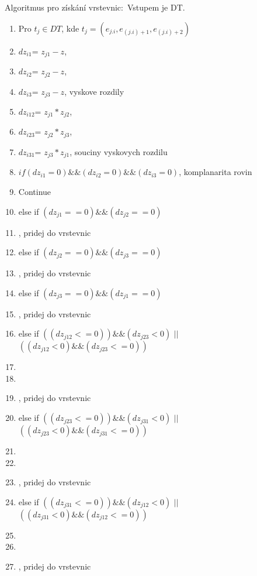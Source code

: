 \documentclass[oneside,12pt,a4paper]{book}
\begin{document}
Algoritmus pro získání vrstevnic$:$
Vstupem je DT.
\begin{enumerate}
\item Pro $t_j \in DT$, kde $t_j = (e_{j.i}, e_{(j.i)+1}, e_{(j.i)+2})$
\item {$dz_{i1}$= $z_{j1}-z$},
\item {$dz_{i2}$= $z_{j2}-z$},
\item {$dz_{i3}$= $z_{j3}-z$}, vyskove rozdily
\item {$dz_{i12}$= $z_{j1}*z_{j2}$},
\item {$dz_{i23}$= $z_{j2}*z_{j3}$},
\item {$dz_{i31}$= $z_{j3}*z_{j1}$}, souciny vyskovych rozdilu
\item {$if(dz_{i1}=0) \&\& (dz_{i2}=0) \&\& (dz_{i3}=0)$}, komplanarita rovin
\item \quad Continue
\item {else if $(dz_{j1}==0) \&\& (dz_{j2}==0)$}
\item {}, pridej do vrstevnic
\item {else if $(dz_{j2}==0) \&\& (dz_{j3}==0)$}
\item {}, pridej do vrstevnic
\item {else if $(dz_{j3}==0) \&\& (dz_{j1}==0)$}
\item {}, pridej do vrstevnic
\item {else if $((dz_{j12}<=0))\&\&(dz_{j23}<0)$ $||$ $((dz_{j12}<0)\&\&(dz_{j23}<=0))$}
\item {}
\item {}
\item {}, pridej do vrstevnic
\item {else if $((dz_{j23}<=0))\&\&(dz_{j31}<0)$ $||$ $((dz_{j23}<0)\&\&(dz_{j31}<=0))$}
\item {}
\item {}
\item {}, pridej do vrstevnic
\item {else if $((dz_{j31}<=0))\&\&(dz_{j12}<0)$ $||$ $((dz_{j31}<0)\&\&(dz_{j12}<=0))$}
\item {}
\item {}
\item {}, pridej do vrstevnic
\end{enumerate}
\end{document}
